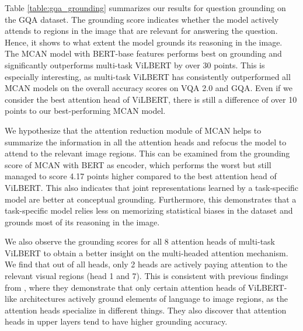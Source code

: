 \documentclass{article}
\begin{document}
Table \ref{table:gqa_grounding} summarizes our results for question grounding on the GQA dataset. The grounding score indicates whether the model actively attends to regions in the image that are relevant for answering the question. Hence, it shows to what extent the model grounds its reasoning in the image. The MCAN model with BERT-base features performs best on grounding and significantly outperforms multi-task ViLBERT by over 30 points. This is especially interesting, as multi-task ViLBERT has consistently outperformed all MCAN models on the overall accuracy scores on VQA 2.0 and GQA. Even if we consider the best attention head of ViLBERT, there is still a difference of over 10 points to our best-performing MCAN model.

We hypothesize that the attention reduction module of MCAN helps to summarize the information in all the attention heads and %
refocus the model to attend to the relevant image regions. This can be examined from the grounding score of MCAN with BERT as encoder, which performs the worst but still managed to score 4.17 points higher compared to the best attention head of ViLBERT. This also indicates that joint representations learned by a task-specific model are better at conceptual grounding. Furthermore, this demonstrates that a task-specific model relies less on memorizing statistical biases in the dataset and grounds most of its reasoning in the image.


We also observe the grounding scores for all 8 attention heads of multi-task ViLBERT to obtain a better insight on the multi-headed attention mechanism. We find that out of all heads, only 2 heads are actively paying attention to the relevant visual regions (head 1 and 7). This is consistent with previous findings from \citet{li2020bert}, where they demonstrate that only certain attention heads of ViLBERT-like architectures actively ground elements of language to image regions, as the attention heads specialize in different things. They also discover that attention heads in upper layers tend to have higher grounding accuracy. 
\end{document}
